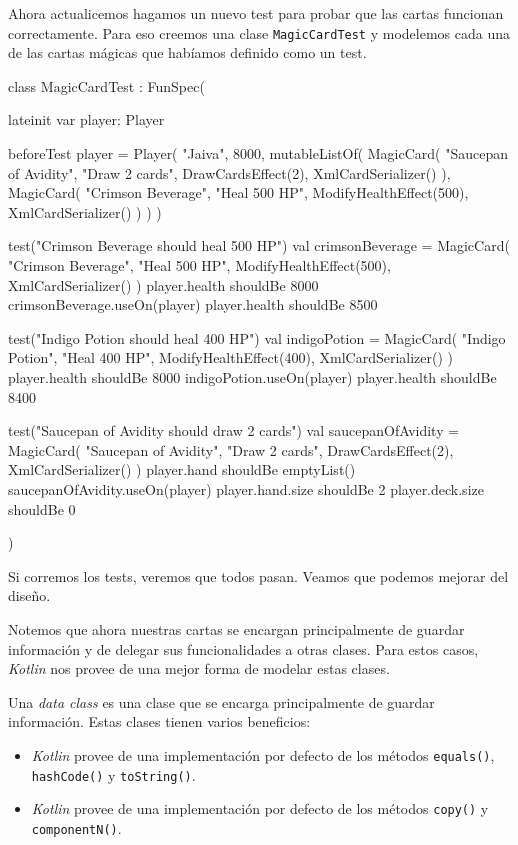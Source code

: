  Ahora actualicemos hagamos un nuevo test para probar que las cartas funcionan correctamente.
  Para eso creemos una clase \texttt{MagicCardTest} y modelemos cada una de las cartas mágicas
  que habíamos definido como un test.

  \begin{kotlin}
    class MagicCardTest : FunSpec({
      lateinit var player: Player

      beforeTest {
        player = Player(
          "Jaiva", 8000, mutableListOf(
            MagicCard(
              "Saucepan of Avidity",
              "Draw 2 cards",
              DrawCardsEffect(2),
              XmlCardSerializer()
            ),
            MagicCard(
              "Crimson Beverage",
              "Heal 500 HP",
              ModifyHealthEffect(500),
              XmlCardSerializer()
            )
          )
        )
      }

      test("Crimson Beverage should heal 500 HP") {
        val crimsonBeverage = MagicCard(
          "Crimson Beverage",
          "Heal 500 HP",
          ModifyHealthEffect(500),
          XmlCardSerializer()
        )
        player.health shouldBe 8000
        crimsonBeverage.useOn(player)
        player.health shouldBe 8500
      }

      test("Indigo Potion should heal 400 HP") {
        val indigoPotion = MagicCard(
          "Indigo Potion",
          "Heal 400 HP",
          ModifyHealthEffect(400),
          XmlCardSerializer()
        )
        player.health shouldBe 8000
        indigoPotion.useOn(player)
        player.health shouldBe 8400
      }

      test("Saucepan of Avidity should draw 2 cards") {
        val saucepanOfAvidity = MagicCard(
          "Saucepan of Avidity",
          "Draw 2 cards",
          DrawCardsEffect(2),
          XmlCardSerializer()
        )
        player.hand shouldBe emptyList()
        saucepanOfAvidity.useOn(player)
        player.hand.size shouldBe 2
        player.deck.size shouldBe 0
      }
    })
  \end{kotlin}

  Si corremos los tests, veremos que todos pasan.
  Veamos que podemos mejorar del diseño.

  Notemos que ahora nuestras cartas se encargan principalmente de guardar información y de
  delegar sus funcionalidades a otras clases.
  Para estos casos, \textit{Kotlin} nos provee de una mejor forma de modelar estas clases.

  \begin{defaultbox}
    Una \textit{data class} es una clase que se encarga principalmente de guardar información.
    Estas clases tienen varios beneficios:
    \begin{itemize}
      \item \textit{Kotlin} provee de una implementación por defecto de los métodos 
        \texttt{equals()}, \texttt{hashCode()} y \texttt{toString()}.
      \item \textit{Kotlin} provee de una implementación por defecto de los métodos
        \texttt{copy()} y \texttt{componentN()}.
    \end{itemize}
  \end{defaultbox}

